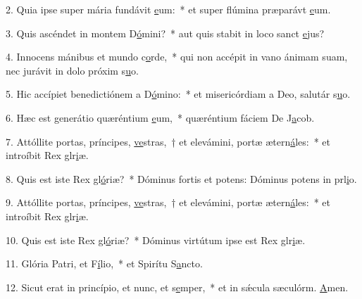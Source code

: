 2. Quia ipse super mária fundávit \uline{e}um:~* et super flúmina præparávt \uline{e}um.\par 
3. Quis ascéndet in montem D\uline{ó}mini?~* aut quis stabit in loco sanct \uline{e}jus?\par 
4. Innocens mánibus et mundo c\uline{o}rde,~* qui non accépit in vano ánimam suam, nec jurávit in dolo próxim s\uline{u}o.\par 
5. Hic accípiet benedictiónem a D\uline{ó}mino:~* et misericórdiam a Deo, salutár s\uline{u}o.\par 
6. Hæc est generátio quæréntium \uline{e}um,~* quæréntium fáciem De J\uline{a}cob.\par 
7. Attóllite portas, príncipes, \uline{ve}stras,~† et elevámini, portæ ætern\uline{á}les:~* et introíbit Rex glr\uline{i}æ.\par 
8. Quis est iste Rex gl\uline{ó}riæ?~* Dóminus fortis et potens: Dóminus potens in prl\uline{i}o.\par 
9. Attóllite portas, príncipes, \uline{ve}stras,~† et elevámini, portæ ætern\uline{á}les:~* et introíbit Rex glr\uline{i}æ.\par 
10. Quis est iste Rex gl\uline{ó}riæ?~* Dóminus virtútum ipse est Rex glr\uline{i}æ.\par 
11. Glória Patri, et F\uline{í}lio,~* et Spirítu S\uline{a}ncto.\par 
12. Sicut erat in princípio, et nunc, et s\uline{e}mper,~* et in sǽcula sæculórm. \uline{A}men.\par 
